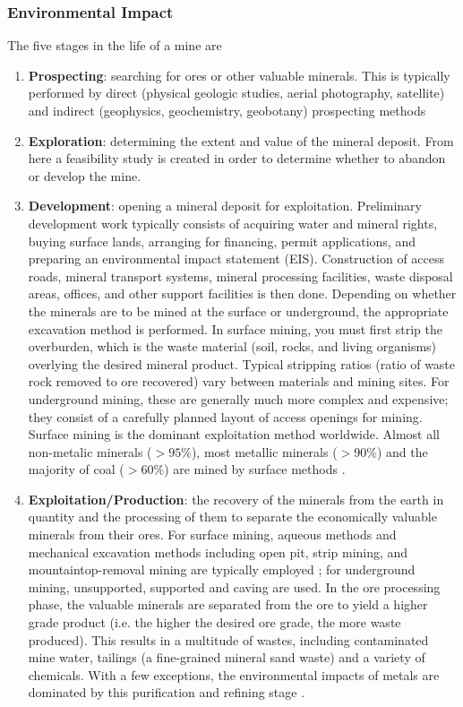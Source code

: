 \documentclass{article}
\begin{document}
\subsubsection{Environmental Impact}
The five stages in the life of a mine are \cite{hartman2002introductory}
\begin{enumerate}
    \item \textbf{Prospecting}: searching for ores or other valuable minerals. This is typically performed by direct (physical geologic studies, aerial photography, satellite) and indirect (geophysics, geochemistry, geobotany) prospecting methods 
    \item \textbf{Exploration}: determining the extent and value of the mineral deposit. From here a feasibility study is created in order to determine whether to abandon or develop the mine.
    
    \item \textbf{Development}: opening a mineral deposit for exploitation. Preliminary development work typically consists of acquiring water and mineral rights, buying surface lands, arranging for financing, permit applications, and preparing an environmental impact statement (EIS). Construction of access roads, mineral transport systems, mineral processing facilities, waste disposal areas, offices, and other support facilities is then done. Depending on whether the minerals are to be mined at the surface or underground, the appropriate excavation method is performed. In surface mining, you must first strip the overburden, which is the waste material (soil, rocks, and living organisms) overlying the desired mineral product. Typical stripping ratios (ratio of waste rock removed to ore recovered) vary between materials and mining sites. For underground mining, these are generally much more complex and expensive; they consist of a carefully planned layout of access openings for mining. Surface mining is the dominant exploitation method worldwide. Almost all non-metalic minerals ($>95\%$), most metallic minerals ($>90\%$) and the majority of coal ($>60\%$) are mined by surface methods \cite{ramani2012surface}. 
    
    \item \textbf{Exploitation/Production}: the recovery of the minerals from the earth in quantity and the processing of them to separate the economically valuable minerals from their ores. For surface mining, aqueous methods and mechanical excavation methods including open pit, strip mining, and mountaintop-removal mining are typically employed \cite{lima2016legacy}; for underground mining, unsupported, supported and caving are used. In the ore processing phase, the valuable minerals are separated from the ore to yield a higher grade product (i.e. the higher the desired ore grade, the more waste produced). This results in a multitude of wastes, including contaminated mine water, tailings (a fine-grained mineral sand waste) and a variety of chemicals. With a few exceptions, the environmental impacts of metals are dominated by this purification and refining stage \cite{nuss2014life}.
    

\end{enumerate}
\end{document}
